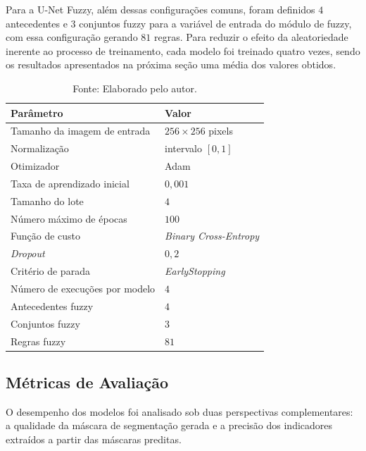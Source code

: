 Para a U-Net Fuzzy, além dessas configurações comuns, foram definidos $4$ antecedentes e $3$ conjuntos fuzzy para a variável de entrada do módulo de fuzzy, com essa configuração gerando $81$ regras. Para reduzir o efeito da aleatoriedade inerente ao processo de treinamento, cada modelo foi treinado quatro vezes, sendo os resultados apresentados na próxima seção uma média dos valores obtidos.

\begin{table}[H]
    \centering
    \caption{Resumo da configuração de treinamento adotada nos experimentos.}
    \begin{tabular}{ll}
        \hline
        \textbf{Parâmetro} & \textbf{Valor} \\
        \hline
        Tamanho da imagem de entrada & $256 \times 256$ pixels \\
        \hline
        Normalização & intervalo $[0,1]$ \\
        \hline
        Otimizador & Adam \\
        \hline
        Taxa de aprendizado inicial & $0{,}001$ \\
        \hline
        Tamanho do lote & $4$ \\
        \hline
        Número máximo de épocas & $100$ \\
        \hline
        Função de custo & \textit{Binary Cross-Entropy} \\
        \hline
        \textit{Dropout} & $0{,}2$ \\
        \hline
        Critério de parada & \textit{EarlyStopping} \\
        \hline
        Número de execuções por modelo & $4$ \\
        \hline
        Antecedentes fuzzy & $4$ \\
        \hline
        Conjuntos fuzzy & $3$ \\
        \hline
        Regras fuzzy & $81$ \\
        \hline
    \end{tabular}
    \caption*{Fonte: Elaborado pelo autor.}
    \label{tab:config_treinamento}
\end{table}

\subsection{Métricas de Avaliação}

O desempenho dos modelos foi analisado sob duas perspectivas complementares: a qualidade da máscara de segmentação gerada e a precisão dos indicadores extraídos a partir das máscaras preditas.

